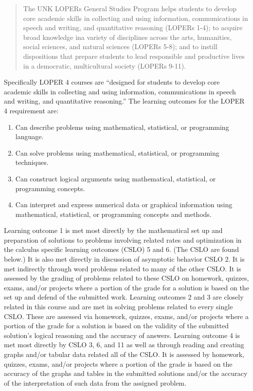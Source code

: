 \documentclass[12pt]{article}
\newcounter{ex}\setcounter{ex}{0}
\begin{document}
\begin{quote}
The UNK LOPERs General Studies Program helps students to develop core academic skills in collecting and using information, communications in speech and writing, and quantitative reasoning (LOPERs 1-4); to acquire broad knowledge ina variety of disciplines across the arts, humanities, social sciences, and natural sciences (LOPERs 5-8); and to instill dispositions that prepare students to lead responsible and productive lives in a democratic, multicultural society (LOPERs 9-11).
\end{quote}

Specifically LOPER 4 courses are ``designed for students to develop core academic skills in collecting and using information, communications in speech and writing, and quantitative reasoning.” The learning outcomes for the LOPER 4 requirement are:
\begin{enumerate}
    \item  Can describe problems using mathematical, statistical, or programming language.

     \item Can solve problems using mathematical, statistical, or programming techniques.

    \item Can construct logical arguments using mathematical, statistical, or programming concepts.

    \item Can interpret and express numerical data or graphical information using mathematical, statistical, or programming concepts and methods.
   \end{enumerate}
   
Learning outcome 1 is met most directly by the mathematical set up and preparation of solutions to problems involving related rates and optimization in the calculus specific learning outcomes (CSLO) 5 and 6. (The CSLO are found below.) It is also met directly in discussion of asymptotic behavior CSLO 2. It is met indirectly through word problems related to many of the other CSLO. It is assessed by the grading of problems related to these CSLO on homework, quizzes, exams, and/or projects where a portion of the grade for a solution is based on the set up and defend of the submitted work.
Learning outcomes 2 and 3 are closely related in this course and are met in solving problems related to every single CSLO. These are assessed via homework, quizzes, exams, and/or projects where a portion of the grade for a solution is based on the validity of the submitted solution’s logical reasoning and the accuracy of answers.
Learning outcome 4 is met most directly by CSLO 3, 6, and 11 as well as through reading and creating graphs and/or tabular data related all of the CSLO. It is assessed by homework, quizzes, exams, and/or projects where a portion of the grade is based on the accuracy of the graphs and tables in the submitted solutions and/or the accuracy of the interpretation of such data from the assigned problem.


  
 
\end{document}
